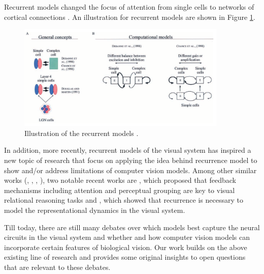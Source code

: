 
\par Recurrent models changed the focus of attention from single cells to networks of cortical connections \cite{martinez_complex_2003}. An illustration for recurrent models are shown in Figure \ref{fig:recurrent-models}.

\begin{figure}[H]
\centering
    \includegraphics[width=10cm]{figures/models/recurrent-models.png}
     \caption{Illustration of the recurrent models \cite{martinez_complex_2003}.}
     \label{fig:recurrent-models}
\end{figure}

In addition, more recently, recurrent models of the visual system has inspired a new topic of research that focus on applying the idea behind recurrence model to show and/or address limitations of computer vision models. Among other similar works (\cite{oreilly_recurrent_2013}, \cite{spoerer_recurrent_2017},  \cite{kietzmann_recurrence_2019}, \cite{van_bergen_going_2020}), two notable recent works are \cite{ricci_same-different_2018}, which proposed that feedback mechanisms including attention and perceptual grouping are key to visual relational reasoning tasks and \cite{kietzmann_recurrence_2019}, which showed that recurrence is necessary to model the representational dynamics in the visual system.


Till today, there are still many debates over which models best capture the neural circuits in the visual system and whether and how computer vision models can incorporate certain features of biological vision. Our work builds on the above existing line of research and provides some original insights to open questions that are relevant to these debates. 


